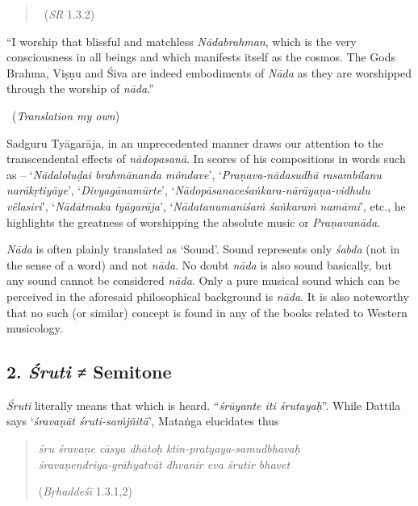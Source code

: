 \vspace{-.5cm}

\begin{verse}

~\hfill (\textit{SR} 1.3.2)
\end{verse}

\begin{myquote}
“I worship that blissful and matchless \textit{Nādabrahman}, which is the very consciousness in all beings and which manifests itself as the cosmos. The Gods Brahma, Viṣṇu and Śiva are indeed embodiments of \textit{Nāda} as they are worshipped through the worship of \textit{nāda}.” 

~\hfill (\textit{Translation my own})
\end{myquote}

Sadguru Tyāgarāja, in an unprecedented manner draws our attention to the transcendental effects of \textit{nādopasanā}. In scores of his compositions in words such as – ‘\textit{Nādaloluḍai brahmānanda môndave}’, ‘\textit{Praṇava-nādasudhā rasambilanu narākṛtiyāye}’, ‘\textit{Divyagānamūrte}’, ‘\textit{Nādopāsanace\break śaṅkara-nārāyaṇa-vidhulu vêlasiri}’, ‘\textit{Nādātmaka tyāgarāja}’, ‘\textit{Nādatanum\break aniśaṁ śaṅkaraṁ namāmi}’, etc., he highlights the greatness of worshipping the absolute music or \textit{Praṇavanāda}.

\textit{Nāda} is often plainly translated as ‘Sound’. Sound represents only \textit{śabda} (not in the sense of a word) and not \textit{nāda}. No doubt \textit{nāda} is also sound basically, but any sound cannot be considered \textit{nāda}. Only a pure musical sound which can be perceived in the aforesaid philosophical background is \textit{nāda}. It is also noteworthy that no such (or similar) concept is found in any of the books related to Western musicology.


\subsection*{2. \textit{Śruti} ≠ Semitone}

\textit{Śruti} literally means that which is heard. “\textit{śrūyante iti śrutayaḥ}”. While Dattila says ‘\textit{śravaṇāt śruti-saṁjñitā}’, Mataṅga elucidates thus

\begin{verse}
\textit{śru śravaṇe cāsya dhātoḥ ktin-pratyaya-samudbhavaḥ }\\ \textit{śravaṇendriya-grāhyatvāt dhvanir eva śrutir bhavet } 
\begin{flushright}
(\textit{Bṛhaddeśī} 1.3.1,2)
\end{flushright}
\end{verse}

